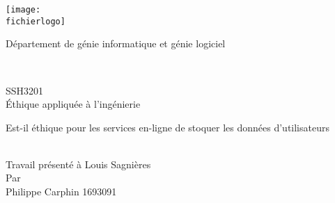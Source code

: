 \documentclass[12pt,titlepage]{article}
\newcommand{\letitre}{Est-il éthique pour les services en-ligne de stoquer les données d'utilisateurs\\}
\newcommand{\presentea}{Louis Sagnières\\}
\newcommand{\fichierlogo}{logo_poly.pdf}
\newcommand{\organisation}{Département de génie informatique et génie logiciel \\ }
\newcommand{\lenumcours}{SSH3201}
\newcommand{\letitrecours}{Éthique appliquée à l'ingénierie}
\newcommand{\lauteur}{Philippe Carphin 1693091}
\begin{document}
\begin{titlepage}

\parbox[c]{1in}{\texttt{[image: \\fichierlogo]}}
\hfill \parbox[c]{3in}{\Large\raggedleft\organisation} \\
%
%
\begin{center}
\vfill
%
%
%
\large
\lenumcours \\
\letitrecours
%
%
\vfill
%
%
\parbox[b]{0.6\textwidth}{\center\letitre}\\
%
{\small Travail présenté à
\presentea}
%
\vfill
Par\\
\lauteur

\end{center}
\end{titlepage}
\end{document}
